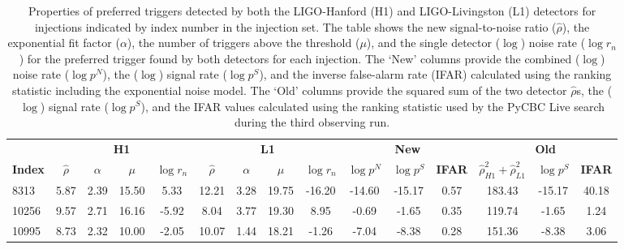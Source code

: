 \begin{landscape}
\begin{table}[tb]
    \centering
    \small
    \setlength{\tabcolsep}{5pt}
    \begin{tabular}{lcccccccccccccc}
        \toprule
        & \multicolumn{4}{c}{\textbf{H1}} & \multicolumn{4}{c}{\textbf{L1}} & \multicolumn{3}{c}{\textbf{New}} & \multicolumn{3}{c}{\textbf{Old}} \\
        \cmidrule(lr){2-5} \cmidrule(lr){6-9} \cmidrule(lr){10-12} \cmidrule(lr){13-15}
        \textbf{Index} & \textbf{$\hat{\rho}$} & \textbf{$\alpha$} & \textbf{$\mu$} & \textbf{$\log r_n$} & \textbf{$\hat{\rho}$} & \textbf{$\alpha$} & \textbf{$\mu$} & \textbf{$\log r_n$} & \textbf{$\log p^{N}$} & \textbf{$\log p^{S}$} & \textbf{IFAR} & \textbf{$\hat{\rho}_{H1}^{2} + \hat{\rho}_{L1}^{2}$} & \textbf{$\log p^{S}$} & \textbf{IFAR} \\
        \midrule
        8313  & 5.87 & 2.39 & 15.50 & 5.33 & 12.21 & 3.28 & 19.75 & -16.20 & -14.60 & -15.17 & 0.57 & 183.43 & -15.17 & 40.18 \\
        
        10256 & 9.57 & 2.71 & 16.16 & -5.92 & 8.04 & 3.77 & 19.30 & 8.95 & -0.69 & -1.65 & 0.35 & 119.74 & -1.65 & 1.24 \\
        
        10995 & 8.73 & 2.32 & 10.00 & -2.05 & 10.07 & 1.44 & 18.21 & -1.26 & -7.04 & -8.38 & 0.28 & 151.36 & -8.38 & 3.06 \\
        \bottomrule
    \end{tabular}
    \caption{Properties of preferred triggers detected by both the LIGO-Hanford (H1) and LIGO-Livingston (L1) detectors for injections indicated by index number in the injection set. The table shows the new signal-to-noise ratio ($\hat{\rho}$), the exponential fit factor ($\alpha$), the number of triggers above the threshold ($\mu$), and the single detector ($\log$) noise rate ($\log r_n$) for the preferred trigger found by both detectors for each injection. The `New' columns provide the combined ($\log$) noise rate ($\log p^{N}$), the ($\log$) signal rate ($\log p^{S}$), and the inverse false-alarm rate (IFAR) calculated using the ranking statistic including the exponential noise model. The `Old' columns provide the squared sum of the two detector $\hat{\rho}$s, the ($\log$) signal rate ($\log p^{S}$), and the IFAR values calculated using the ranking statistic used by the PyCBC Live search during the third observing run.}
    \label{5:tab:bottom-right-rank-stat}
\end{table}
\end{landscape}
